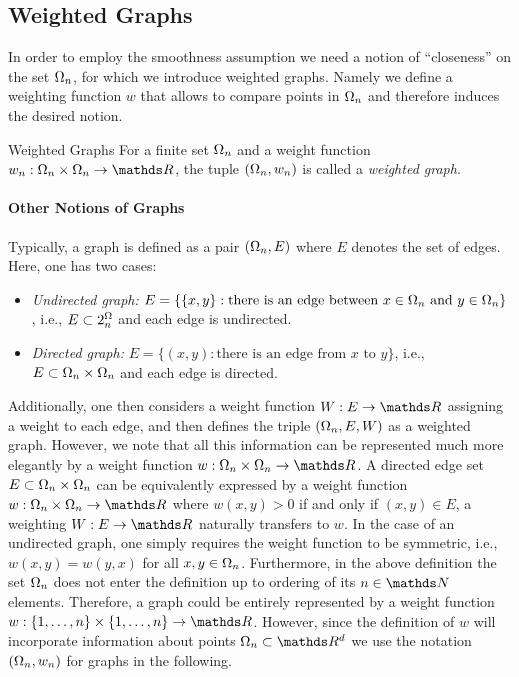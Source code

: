 \subsection{Weighted Graphs}
In order to employ the smoothness assumption we need a notion of \enquote{closeness} on the set $\Omega_n$, for which we introduce weighted graphs. Namely we define a weighting function $w$ that allows to compare points in $\Omega_n$ and therefore induces the desired notion. 
%
\begin{definition}{Weighted Graphs}{}
For a finite set $\Omega_n$ and a weight function $w_n:\domain_n\times \domain_n\to\R$, the tuple $(\Omega_n,w_n)$ is called a \emph{weighted graph}.
\end{definition}
%
%
\paragraph{Other Notions of Graphs}
Typically, a graph is defined as a pair $(\Omega_n,E)$ where $E$ denotes the set of edges. Here, 
one has two cases:
\begin{itemize}
\item \emph{Undirected graph:} $E=\{ \{x,y\}: \text{there is an edge between } x\in \Omega_n \text{ and } y\in \Omega_n\}$, i.e., 
$E\subset 2^\Omega_n$ and each edge is undirected.
%
\item \emph{Directed graph:} $E=\{ (x,y): \text{there is an edge from } x \text{ to } y\}$, i.e.,
$E\subset \Omega_n\times \Omega_n$ and each edge is directed.
%
\end{itemize}
Additionally, one then considers a weight function $W:E\to\R$ assigning a weight to each edge, and then defines 
the triple $(\Omega_n,E,W)$ as a weighted graph. However, we note that all this information can be represented much more elegantly by a weight function $w:\domain_n\times \domain_n\to\R$. A directed edge set $E\subset \Omega_n\times \Omega_n$ can be equivalently expressed by 
a weight function $w:\domain_n\times \domain_n\to\R$ where $w(x,y)>0$ if and only if $(x,y)\in E$, a weighting $W:E\to\R$ 
naturally transfers to $w$. In the case of an undirected graph, one simply requires the weight function to be symmetric, i.e., 
$w(x,y)=w(y,x)$ for all $x,y\in \Omega_n$.
%
Furthermore, in the above definition the set $\Omega_n$ does not enter the definition up to ordering of its $n\in \N$  elements. Therefore, a graph could be entirely represented by a weight function $w:\{1,\ldots,n\}\times\{1,\ldots,n\}\to\R$. However, since the definition of $w$ will incorporate information about points $\domain_n\subset\R^d$ we use the notation $(\Omega_n, w_n)$ for graphs in the following.
%
%
%
